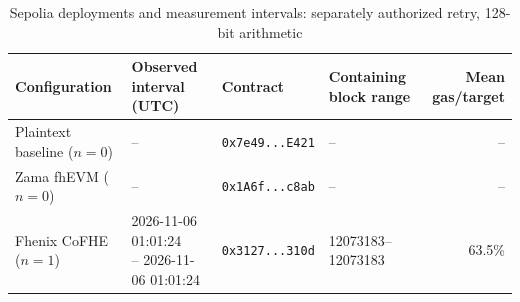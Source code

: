\begin{table}[!t]
\caption{Sepolia deployments and measurement intervals: separately authorized retry, 128-bit arithmetic}
\label{tab:sepolia-explicit-retry-classic-euint128}
\centering
\footnotesize
\setlength{\tabcolsep}{4pt}
\begin{tabular}{|l|l|l|l|r|}
\hline
\textbf{Configuration} &
\textbf{Observed interval (UTC)} &
\textbf{Contract} &
\textbf{Containing block range} &
\textbf{Mean gas/target} \\
\hline
Plaintext baseline (\(n=0\)) &
-- &
\texttt{0x7e49...E421} &
-- &
-- \\
\hline
Zama fhEVM (\(n=0\)) &
-- &
\texttt{0x1A6f...c8ab} &
-- &
-- \\
\hline
Fhenix CoFHE (\(n=1\)) &
\shortstack[l]{2026-11-06 01:01:24 \\ -- 2026-11-06 01:01:24} &
\texttt{0x3127...310d} &
12073183--12073183 &
63.5\% \\
\hline
\end{tabular}
\end{table}
